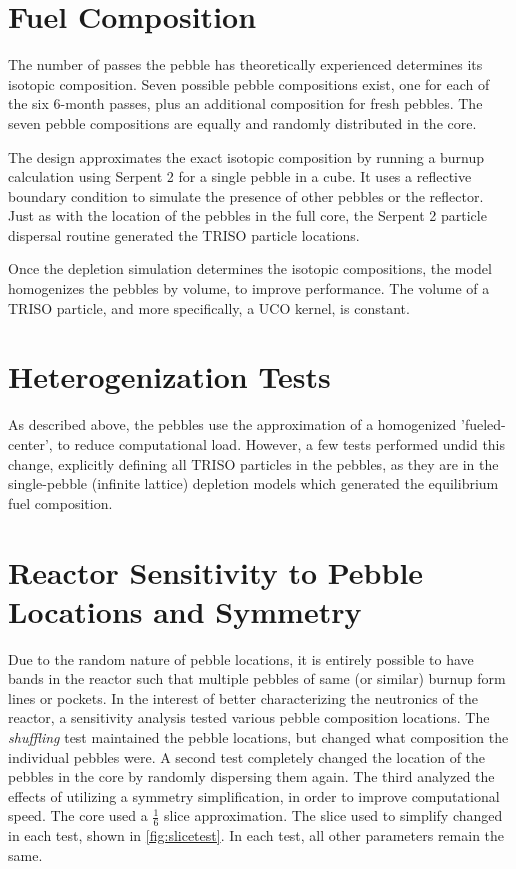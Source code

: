 \section{Fuel Composition}

The number of passes the pebble has theoretically experienced determines its isotopic composition.  Seven possible pebble compositions exist, one for each of the six 6-month passes, plus an additional composition for fresh pebbles.  The seven pebble compositions are equally and randomly distributed in the core.

The design approximates the exact isotopic composition by running a burnup calculation using Serpent 2 for a single pebble in a cube.  It uses a reflective boundary condition to simulate the presence of other pebbles or the reflector.  Just as with the location of the pebbles in the full core, the Serpent 2 particle dispersal routine generated the TRISO particle locations.



Once the depletion simulation determines the isotopic compositions, the model homogenizes the pebbles by volume, to improve performance.  The volume of a TRISO particle, and more specifically, a UCO kernel, is constant.

\section{Heterogenization Tests}

As described above, the pebbles use the approximation of a homogenized 'fueled-center', to reduce computational load.  However, a few tests performed undid this change, explicitly defining all TRISO particles in the pebbles, as they are in the single-pebble (infinite lattice) depletion models which generated the equilibrium fuel composition.

\section{Reactor Sensitivity to Pebble Locations and Symmetry}

Due to the random nature of pebble locations, it is entirely possible to have bands in the reactor such that multiple pebbles of same (or similar) burnup form lines or pockets.  In the interest of better characterizing the neutronics of the reactor, a sensitivity analysis tested various pebble composition locations.  The \emph{shuffling} test maintained the pebble locations, but changed what composition the individual pebbles were.  A second test completely changed the location of the pebbles in the core by randomly dispersing them again.  The third analyzed the effects of utilizing a symmetry simplification, in order to improve computational speed.  The core used a $\frac{1}{6}$ slice approximation.  The slice used to simplify changed in each test, shown in \ref{fig:slicetest}.  In each test, all other parameters remain the same.

